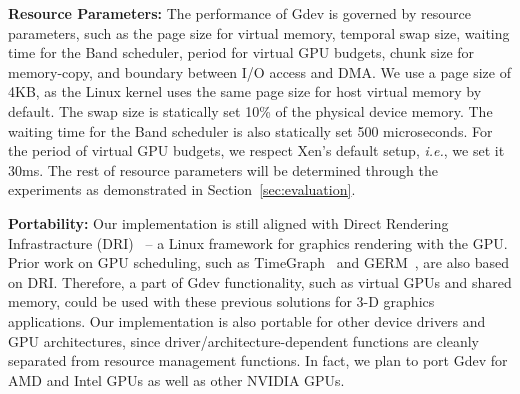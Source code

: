 \textbf{Resource Parameters:}
The performance of Gdev is governed by resource parameters, such as the
page size for virtual memory, temporal swap size, waiting time for the
Band scheduler, period for virtual GPU budgets, chunk size
for memory-copy, and boundary between I/O access and DMA.
We use a page size of 4KB, as the Linux kernel uses the same page size
for host virtual memory by default.
The swap size is statically set 10\% of the physical device memory.
The waiting time for the Band scheduler is also statically set 500
microseconds.
For the period of virtual GPU budgets, we respect Xen's default setup,
\textit{i.e.}, we set it 30ms.
The rest of resource parameters will be determined through the experiments as
demonstrated in Section~\ref{sec:evaluation}.

\textbf{Portability:}
Our implementation is still aligned with Direct Rendering Infrastracture
(DRI)~\cite{DRI} -- a Linux framework for graphics rendering with the GPU.
Prior work on GPU scheduling, such as TimeGraph~\cite{Kato_ATC11} and
GERM~\cite{Bautin_MCNC08}, are also based on DRI.
Therefore, a part of Gdev functionality, such as virtual GPUs and shared
memory, could be used with these previous solutions for 3-D graphics
applications.
Our implementation is also portable for other device drivers and GPU
architectures, since driver/architecture-dependent functions are cleanly
separated from resource management functions.
In fact, we plan to port Gdev for AMD and Intel GPUs as well as other
NVIDIA GPUs.

